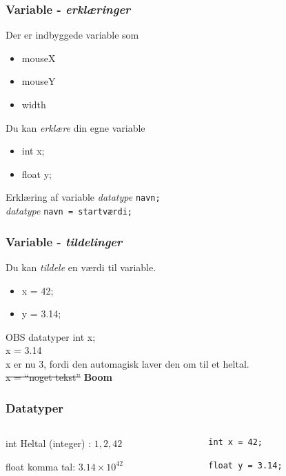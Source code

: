 \documentclass{beamer}
\begin{document}
\begin{frame}
  \frametitle{Variable - \emph{erklæringer}}
  
  Der er indbyggede variable som
  \begin{itemize}
  \item mouseX
  \item mouseY
  \item width
  \end{itemize}

  Du kan \emph{erklære} din egne variable
  \begin{itemize}
  \item int x;
  \item float y;
  \end{itemize}

  \begin{block}{Erklæring af variable}
    \emph{datatype} \texttt{navn;}\\
    \emph{datatype} \texttt{navn = startværdi;} 
  \end{block}

\end{frame}

\begin{frame}
  \frametitle{Variable - \emph{tildelinger}}
  
  Du kan \emph{tildele} en værdi til variable.
  \begin{itemize}
  \item x = 42;
  \item y = 3.14;
  \end{itemize}


  \begin{block}{OBS datatyper}
    int x; \\
    x = 3.14 \\
    x er nu 3, fordi den automagisk laver den om til et heltal. \\
    \sout{x = ``noget tekst''} \textbf{Boom}
  \end{block}

\end{frame}



\begin{frame}[fragile]
  \frametitle{Datatyper}
  \begin{columns}
    \begin{column}{0.4\textwidth}
      \begin{block}{int}
        Heltal (integer) : $1,2,42$
      \end{block}
      \begin{block}{float}
        komma tal: $3.14 \times 10^{42}$
      \end{block}

    \end{column}
    \begin{column}{0.6\textwidth}    
\begin{verbatim}
int x = 42;

float y = 3.14;
\end{verbatim}

    \end{column}
  \end{columns}  
\end{frame}
\end{document}

